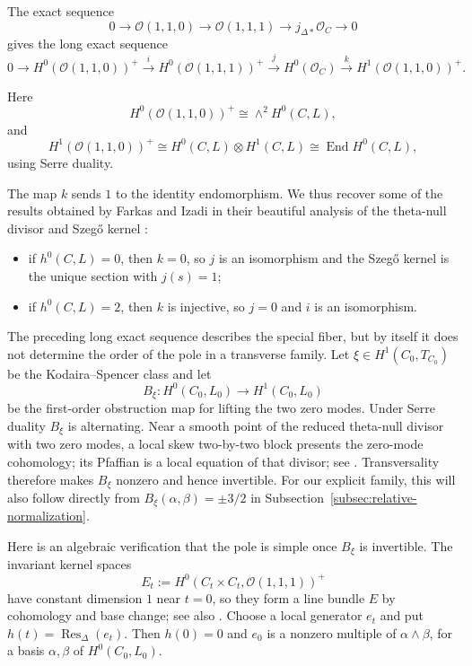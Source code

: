 \documentclass[11pt]{article}
\newcommand{\OO}{\mathcal O}
\begin{document}
The exact sequence
\begin{equation}
    0\to \OO(1,1,0)\to \OO(1,1,1)\to {j_{\Delta*}\OO_C}\to 0
\end{equation}
gives the long exact sequence
\begin{equation}
0\to {H^0(\OO(1,1,0))^+}\xrightarrow{i}
{H^0(\OO(1,1,1))^+}\xrightarrow{j}
H^0(\OO_C)\xrightarrow{k}
{H^1(\OO(1,1,0))^+}.
\end{equation}

Here
\[
{H^0(\OO(1,1,0))^+} \cong \wedge^2 H^0(C,L),
\]
and
\[
{H^1(\OO(1,1,0))^+} \cong H^0(C,L)\otimes H^1(C,L)
\cong \operatorname{End}H^0(C,L),
\]
using Serre duality.

The map $k$ sends $1$ to the identity endomorphism. We thus recover some of the results obtained by
Farkas and Izadi in their beautiful analysis of the theta-null divisor and Szeg\H{o} kernel \cite{FI}:
\begin{itemize}[leftmargin=2em]
\item if $h^0(C,L)=0$, then $k=0$, so $j$ is an isomorphism and the Szeg\H{o} kernel is the unique section with $j(s)=1$;
\item if $h^0(C,L)=2$, then $k$ is injective, so $j=0$ and $i$ is an isomorphism.
\end{itemize}

The preceding long exact sequence describes the special fiber, but by
itself it does not determine the order of the pole in a transverse
family.  Let $\xi{\in H^1(C_0,T_{C_0})}$ be the
Kodaira--Spencer class and let
\[
B_\xi:H^0(C_0,L_0)\longrightarrow H^1(C_0,L_0)
\]
be the first-order obstruction map for lifting the two zero modes.  {Under Serre duality $B_\xi$ is alternating. Near a smooth point
of the reduced theta-null divisor with two zero modes, a local skew
two-by-two block presents the zero-mode cohomology; its Pfaffian is a
local equation of that divisor; {see \cite[Section~4.4]{FKP}}. Transversality therefore makes
$B_\xi$ nonzero and hence invertible. For our explicit family, this
will also follow directly from
$B_\xi(\alpha,\beta)=\pm3/2$ in
Subsection~\ref{subsec:relative-normalization}.}

\begingroup
Here is an algebraic verification that the pole is simple once $B_\xi$
is invertible. The invariant kernel spaces
\[
E_t:=H^0(C_t\times C_t,\OO(1,1,1))^+
\]
have constant dimension $1$ near $t=0$, so they form a line bundle $E$
by cohomology and base change; see also \cite[Proposition~1.2]{FI}.
Choose a local generator $e_t$ and put
$h(t)=\operatorname{Res}_\Delta(e_t)$. Then $h(0)=0$ and
$e_0$ is a nonzero multiple of $\alpha\wedge\beta$, for a basis
$\alpha,\beta$ of $H^0(C_0,L_0)$.
\end{document}
